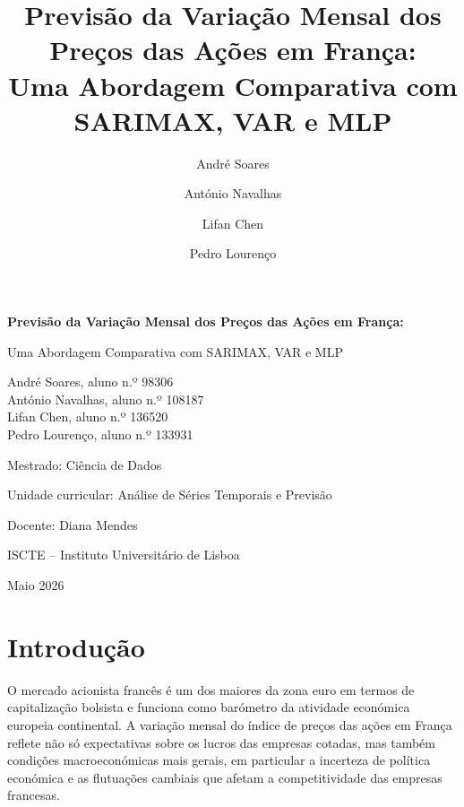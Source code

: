 \documentclass[12pt,a4paper]{article}
\title{\textbf{Previsão da Variação Mensal dos Preços das Ações em França:\\
Uma Abordagem Comparativa com SARIMAX, VAR e MLP}}
\author{André Soares \and António Navalhas \and Lifan Chen \and Pedro Lourenço }
\date{}
\begin{document}

\begin{titlepage}
  \thispagestyle{empty}
  \centering
  \vspace*{2.0cm}

  {\LARGE\bfseries Previsão da Variação Mensal dos Preços das Ações em França:\par}
  \vspace{0.35cm}
  {\Large Uma Abordagem Comparativa com SARIMAX, VAR e MLP\par}

  \vfill

  {\large
  André Soares, aluno n.º 98306\\[0.25cm]
  António Navalhas, aluno n.º 108187\\[0.25cm]
  Lifan Chen, aluno n.º 136520\\[0.25cm]
  Pedro Lourenço, aluno n.º 133931\par}

  \vfill

  {\large Mestrado: Ciência de Dados\par}
  \vspace{0.55cm}
  {\large Unidade curricular: Análise de Séries Temporais e Previsão\par}
  \vspace{0.55cm}
  {\large Docente: Diana Mendes\par}
  \vspace{0.55cm}
  {\large ISCTE -- Instituto Universitário de Lisboa\par}

  \vfill

  {\large Maio 2026\par}

  \vspace*{1.0cm}
\end{titlepage}

\clearpage
\tableofcontents
\clearpage

\section{Introdução}

O mercado acionista francês é um dos maiores da zona euro em termos de capitalização bolsista e funciona como barómetro da atividade económica europeia continental. A variação mensal do índice de preços das ações em França reflete não só expectativas sobre os lucros das empresas cotadas, mas também condições macroeconómicas mais gerais, em particular a incerteza de política económica e as flutuações cambiais que afetam a competitividade das empresas francesas.
\end{document}
